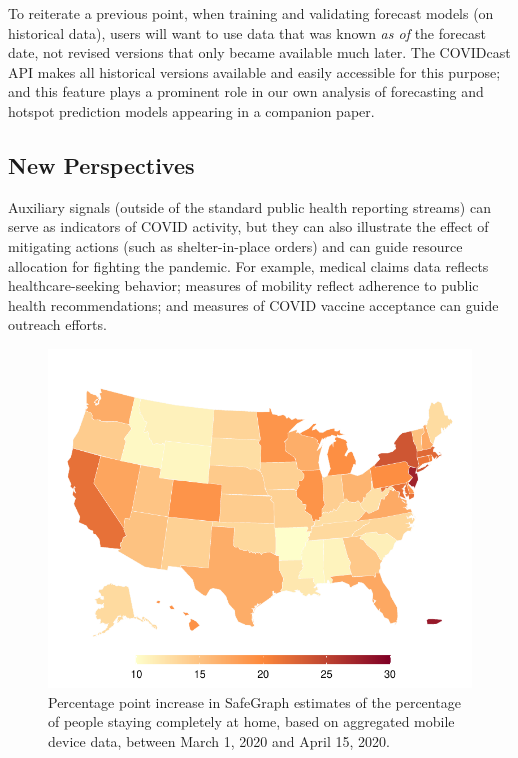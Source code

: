 \documentclass[9pt,twocolumn,twoside,lineno]{pnas-new}
\begin{document}
To reiterate a previous point, when training and validating forecast models (on
historical data), users will want to use data that was known \textit{as of} the
forecast date, not revised versions that only became available much later. The
COVIDcast API makes all historical versions available and easily accessible for
this purpose; and this feature plays a prominent role in our own analysis of
forecasting and hotspot prediction models appearing in a companion paper.

\subsection{New Perspectives}

Auxiliary signals (outside of the standard public health reporting streams) can
serve as indicators of COVID activity, but they can also illustrate the effect
of mitigating actions (such as shelter-in-place orders) and can guide resource 
allocation for fighting the pandemic. For example, medical claims data reflects
healthcare-seeking behavior; measures of mobility reflect adherence to public
health recommendations; and measures of COVID vaccine acceptance can guide
outreach efforts.

\begin{figure}
  \centering
  \includegraphics[width=\columnwidth]{fig/mobility-drop.pdf}
  \caption{Percentage point increase in SafeGraph estimates of the percentage of
  people staying completely at home, based on aggregated mobile device data,
  between March 1, 2020 and April 15, 2020.}
  \label{fig:mobility-drop}
\end{figure}
\end{document}
